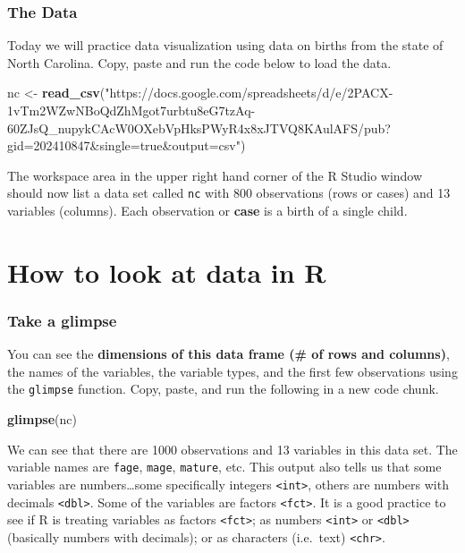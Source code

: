 \documentclass[]{article}
\newenvironment{Shaded}{\begin{snugshade}}{\end{snugshade}}
\newcommand{\KeywordTok}[1]{\textcolor[rgb]{0.13,0.29,0.53}{\textbf{#1}}}
\newcommand{\NormalTok}[1]{#1}
\newcommand{\StringTok}[1]{\textcolor[rgb]{0.31,0.60,0.02}{#1}}
\begin{document}
\hypertarget{the-data}{%
\subsubsection{The Data}\label{the-data}}

Today we will practice data visualization using data on births from the
state of North Carolina. Copy, paste and run the code below to load the
data.

\begin{Shaded}
\begin{Highlighting}[]
\NormalTok{nc <-}\StringTok{ }\KeywordTok{read_csv}\NormalTok{(}\StringTok{"https://docs.google.com/spreadsheets/d/e/2PACX-1vTm2WZwNBoQdZhMgot7urbtu8eG7tzAq-60ZJsQ_nupykCAcW0OXebVpHksPWyR4x8xJTVQ8KAulAFS/pub?gid=202410847&single=true&output=csv"}\NormalTok{)}
\end{Highlighting}
\end{Shaded}

The workspace area in the upper right hand corner of the R Studio window
should now list a data set called \texttt{nc} with 800 observations
(rows or cases) and 13 variables (columns). Each observation or
\textbf{case} is a birth of a single child.

\hypertarget{how-to-look-at-data-in-r}{%
\section{How to look at data in R}\label{how-to-look-at-data-in-r}}

\hypertarget{take-a-glimpse}{%
\subsubsection{Take a glimpse}\label{take-a-glimpse}}

You can see the \textbf{dimensions of this data frame (\# of rows and
columns)}, the names of the variables, the variable types, and the first
few observations using the \texttt{glimpse} function. Copy, paste, and
run the following in a new code chunk.

\begin{Shaded}
\begin{Highlighting}[]
\KeywordTok{glimpse}\NormalTok{(nc)}
\end{Highlighting}
\end{Shaded}

We can see that there are 1000 observations and 13 variables in this
data set. The variable names are \texttt{fage}, \texttt{mage},
\texttt{mature}, etc. This output also tells us that some variables are
numbers\ldots{}some specifically integers
\texttt{\textless{}int\textgreater{}}, others are numbers with decimals
\texttt{\textless{}dbl\textgreater{}}. Some of the variables are factors
\texttt{\textless{}fct\textgreater{}}. It is a good practice to see if R
is treating variables as factors \texttt{\textless{}fct\textgreater{}};
as numbers \texttt{\textless{}int\textgreater{}} or
\texttt{\textless{}dbl\textgreater{}} (basically numbers with decimals);
or as characters (i.e.~text) \texttt{\textless{}chr\textgreater{}}.
\end{document}
